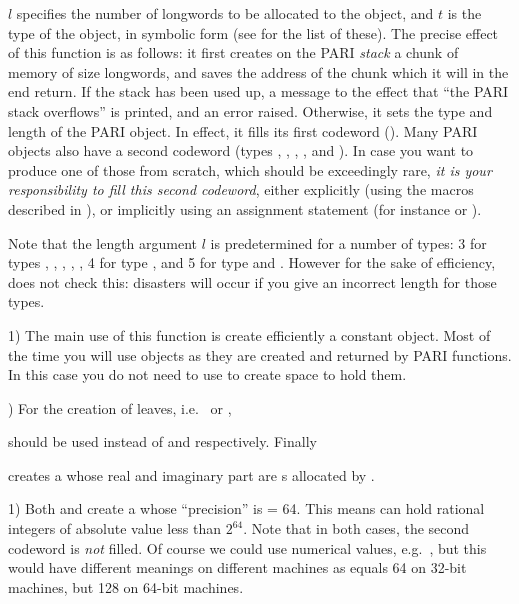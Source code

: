 $l$ specifies the number of longwords to be allocated to the
object, and $t$ is the type of the object, in symbolic
form (see  for the list of these). The precise effect of
this function is as follows: it first creates on the PARI \emph{stack} a
chunk of memory of size  longwords, and saves the address of the
chunk which it will in the end return. If the stack has been used up, a
message to the effect that ``the PARI stack overflows'' is printed,
and an error raised. Otherwise, it sets the type and length of the PARI object.
In effect, it fills its first codeword (). Many PARI
objects also have a second codeword (types , ,
, , and ). In case you want to produce one of
those from scratch, which should be exceedingly rare, \emph{it is your
responsibility to fill this second codeword}, either explicitly (using the
macros described in ), or implicitly using an assignment
statement (for instance  or ).

Note that the length argument $l$ is predetermined for a number of types:
3 for types , , , ,
, 4 for type , and 5 for type  and .
However for the sake of efficiency,  does not check this: disasters
will occur if you give an incorrect length for those types.

 1)  The main use of this function is create efficiently
a constant object. Most of the time you will use  objects as they
are created and returned by PARI functions. In this case you do not need to
use  to create space to hold them.

) For the creation of leaves, i.e.~ or ,



\noindent should be used instead of  and
 respectively. Finally


\noindent creates a  whose real and imaginary part are
s allocated by .

 1) Both  and
 create a  whose ``precision'' is
 = 64. This means  can hold rational
integers of absolute value less than $2^{64}$. Note that in both cases, the
second codeword is \emph{not} filled. Of course we could use numerical
values, e.g.~, but this would have different meanings on
different machines as  equals 64 on 32-bit machines,
but 128 on 64-bit machines.


